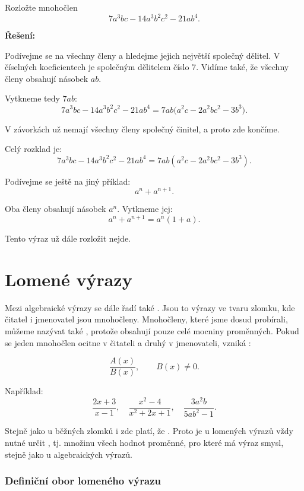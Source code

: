 \documentclass[12pt,a4paper]{article}
\begin{document}
\newpage
\begin{examplebox}
Rozložte mnohočlen
\[
7a^3bc - 14a^3b^2c^2 - 21ab^4.
\]

\textbf{Řešení:}

Podívejme se na všechny členy a hledejme jejich největší společný dělitel.  
V číselných koeficientech je společným dělitelem číslo \(7\).  
Vidíme také, že všechny členy obsahují násobek \(ab\).  

Vytkneme tedy \(7ab\):
\[
7a^3bc - 14a^3b^2c^2 - 21ab^4 = 7ab \bigl(a^2c - 2a^2bc^2 - 3b^3\bigr).
\]

V závorkách už nemají všechny členy společný činitel, a proto zde končíme.  

Celý rozklad je:
\[
7a^3bc - 14a^3b^2c^2 - 21ab^4 = 7ab(a^2c - 2a^2bc^2 - 3b^3).
\]

\medskip
Podívejme se ještě na jiný příklad:
\[
a^n + a^{n+1}.
\]

Oba členy obsahují násobek \(a^n\). Vytkneme jej:
\[
a^n + a^{n+1} = a^n(1+a).
\]

Tento výraz už dále rozložit nejde.  
\end{examplebox}


\section{Lomené výrazy}

Mezi algebraické výrazy se dále řadí také .  
Jsou to výrazy ve tvaru zlomku, kde čitatel i jmenovatel jsou mnohočleny.  
Mnohočleny, které jsme dosud probírali, můžeme nazývat také ,  
protože obsahují pouze celé mocniny proměnných. Pokud se jeden mnohočlen ocitne v čitateli  
a druhý v jmenovateli, vzniká :

\[
\frac{A(x)}{B(x)}, \qquad B(x) \neq 0.
\]

Například:
\[
\frac{2x+3}{x-1}, \quad \frac{x^2-4}{x^2+2x+1}, \quad \frac{3a^2b}{5ab^2-1}.
\]

Stejně jako u běžných zlomků i zde platí, že .  
Proto je u lomených výrazů vždy nutné určit , 
tj. množinu všech hodnot proměnné, pro které má výraz smysl, stejně jako u algebraických výrazů.

\subsubsection*{Definiční obor lomeného výrazu}
\end{document}
